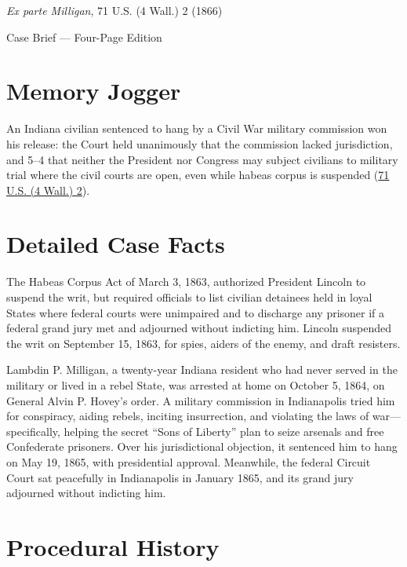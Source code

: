 \documentclass[12pt]{article}
\begin{document}
\begin{center}
{\LARGE \textit{Ex parte Milligan}, 71 U.S. (4 Wall.) 2 (1866)\par}
\vspace{0.8em}
{\large Case Brief --- Four-Page Edition\par}
\end{center}
\vspace{1em}

\section{Memory Jogger}

An Indiana civilian sentenced to hang by a Civil War military commission won his release: the Court held unanimously that the commission lacked jurisdiction, and 5--4 that neither the President nor Congress may subject civilians to military trial where the civil courts are open, even while habeas corpus is suspended (\href{https://supreme.justia.com/cases/federal/us/71/2/}{71 U.S. (4 Wall.) 2}).

\section{Detailed Case Facts}

The Habeas Corpus Act of March 3, 1863, authorized President Lincoln to suspend the writ, but required officials to list civilian detainees held in loyal States where federal courts were unimpaired and to discharge any prisoner if a federal grand jury met and adjourned without indicting him. Lincoln suspended the writ on September 15, 1863, for spies, aiders of the enemy, and draft resisters.

Lambdin P. Milligan, a twenty-year Indiana resident who had never served in the military or lived in a rebel State, was arrested at home on October 5, 1864, on General Alvin P. Hovey's order. A military commission in Indianapolis tried him for conspiracy, aiding rebels, inciting insurrection, and violating the laws of war---specifically, helping the secret ``Sons of Liberty'' plan to seize arsenals and free Confederate prisoners. Over his jurisdictional objection, it sentenced him to hang on May 19, 1865, with presidential approval. Meanwhile, the federal Circuit Court sat peacefully in Indianapolis in January 1865, and its grand jury adjourned without indicting him.

\section{Procedural History}
\end{document}
